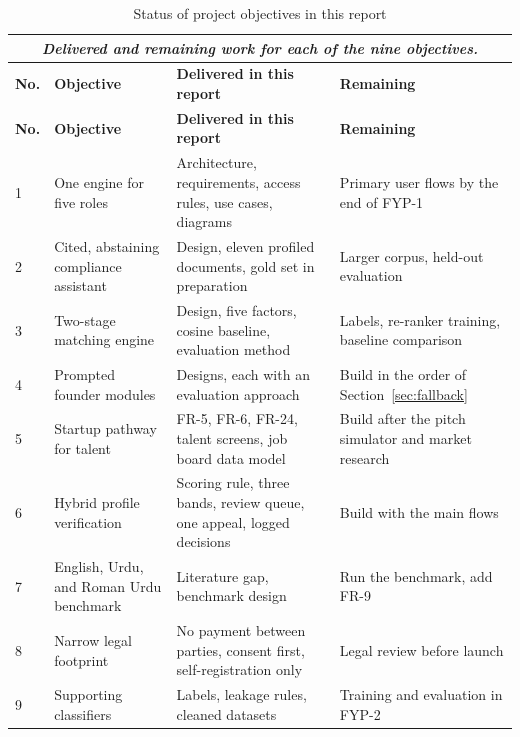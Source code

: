 \documentclass{FastFyp}
\newcommand{\capdesclt}[2]{%
  \multicolumn{#1}{c}{%
    \begingroup\setstretch{1}%
    \parbox[t]{0.92\textwidth}{%
      \centering\normalfont\mdseries\itshape\small #2%
      \vspace{0.15\baselineskip}}%
    \endgroup}\\
}
\begin{document}
\begin{longtable}{|p{}|p{}|p{}|p{}|}
\caption{Status of project objectives in this report}
\label{tab:objectives-status}\\[-10pt]
\capdesclt{4}{Delivered and remaining work for each of the nine objectives.}
\hline
\textbf{No.} & \textbf{Objective} & \textbf{Delivered in this report} & \textbf{Remaining} \\ \hline
\endfirsthead
\hline
\textbf{No.} & \textbf{Objective} & \textbf{Delivered in this report} & \textbf{Remaining} \\ \hline
\endhead

1 & One engine for five roles & Architecture, requirements, access rules, use cases, diagrams & Primary user flows by the end of FYP-1 \\ \hline

2 & Cited, abstaining compliance assistant & Design, eleven profiled documents, gold set in preparation & Larger corpus, held-out evaluation \\ \hline

3 & Two-stage matching engine & Design, five factors, cosine baseline, evaluation method & Labels, re-ranker training, baseline comparison \\ \hline

4 & Prompted founder modules & Designs, each with an evaluation approach & Build in the order of Section~\ref{sec:fallback} \\ \hline

5 & Startup pathway for talent & FR-5, FR-6, FR-24, talent screens, job board data model & Build after the pitch simulator and market research \\ \hline

6 & Hybrid profile verification & Scoring rule, three bands, review queue, one appeal, logged decisions & Build with the main flows \\ \hline

7 & English, Urdu, and Roman Urdu benchmark & Literature gap, benchmark design & Run the benchmark, add FR-9 \\ \hline

8 & Narrow legal footprint & No payment between parties, consent first, self-registration only & Legal review before launch \\ \hline

9 & Supporting classifiers & Labels, leakage rules, cleaned datasets & Training and evaluation in FYP-2 \\ \hline

\end{longtable}
\end{document}
